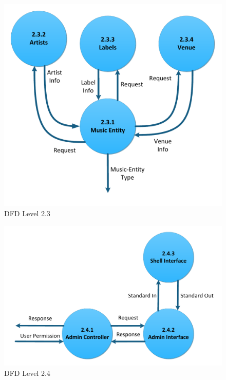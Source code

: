 \documentclass[letterpaper,12pt]{article}
\begin{document}
{\eject

\begin{figure}[h]
\centering
\includegraphics[scale=0.7]{DFD_level_2_3.pdf}
\caption{DFD Level 2.3}
\label{fig:DFD_level_2.3}
\end{figure}

\eject

\begin{figure}[h]
\centering
\includegraphics[scale=0.7]{DFD_level_2_4.pdf}
\caption{DFD Level 2.4}
\label{fig:DFD_level_2.4}
\end{figure}

\eject

}
\end{document}
